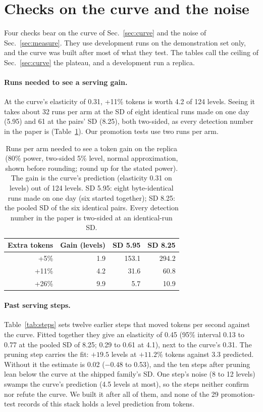 \section{Checks on the curve and the noise}\label{app:curve-checks}

Four checks bear on the curve of Sec.~\ref{sec:curve} and the noise of Sec.~\ref{sec:measure}.
They use development runs on the demonstration set only, and the curve was built after most of what they test. The tables call the ceiling of Sec.~\ref{sec:curve} the plateau, and a development run a replica.

\paragraph{Runs needed to see a serving gain.}
At the curve's elasticity of 0.31, +11\% tokens is worth 4.2 of 124 levels. Seeing it takes about 32 runs per arm at the SD of eight identical runs made on one day (5.95) and 61 at the pairs' SD (8.25), both two-sided, as every detection number in the paper is (Table~\ref{tab:detect}). %
Our promotion tests use two runs per arm.

\begin{table}[!htb]
\centering\footnotesize
\caption{Runs per arm needed to see a token gain on the replica (80\% power, two-sided 5\% level, normal approximation, shown before rounding; round up for the stated power). The gain is the curve's prediction (elasticity 0.31 on levels) out of 124 levels. SD 5.95: eight byte-identical runs made on one day (six started together); SD 8.25: the pooled SD of the six identical pairs. Every detection number in the paper is two-sided at an identical-run SD.}\label{tab:detect}
\setlength{\tabcolsep}{4pt}
\begin{tabular}{@{}rrrr@{}}
\toprule
Extra tokens & Gain (levels) & SD 5.95 & SD 8.25 \\
\midrule
+5\% & 1.9 & 153.1 & 294.2 \\ %
+11\% & 4.2 & 31.6 & 60.8 \\ %
+26\% & 9.9 & 5.7 & 10.9 \\ %
\bottomrule
\end{tabular}
\end{table}

\paragraph{Past serving steps.}
Table~\ref{tab:steps} sets twelve earlier steps that moved tokens per second against the curve. Fitted together they give an elasticity of 0.45 (95\% interval 0.13 to 0.77 at the pooled SD of 8.25; 0.29 to 0.61 at 4.1), next to the curve's 0.31. %
The pruning step carries the fit: $+19.5$ levels at $+11.2\%$ tokens against 3.3 predicted. Without it the estimate is 0.02 ($-0.48$ to 0.53), and the ten steps after pruning lean below the curve at the shipped family's SD. %
One step's noise (8 to 12 levels) swamps the curve's prediction (4.5 levels at most), so the steps neither confirm nor refute the curve. We built it after all of them, and none of the 29 promotion-test records of this stack holds a level prediction from tokens. %


